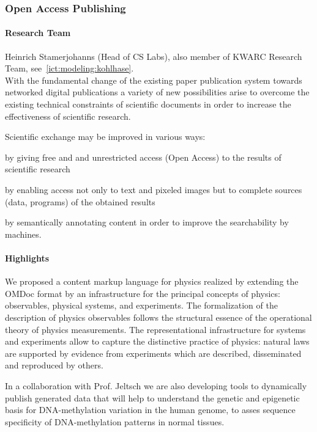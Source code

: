 \subsubsection{Open Access Publishing}
\label{ict:stamer}

\paragraph{Research Team}
Heinrich Stamerjohanns (Head of CS Labs), also member of KWARC
Research Team, see~\ref{ict:modeling:kohlhase}.\\

With the fundamental change of the existing paper publication system
towards networked digital publications a variety of new possibilities arise
to overcome the existing technical constraints of scientific documents
in order to increase the effectiveness of scientific research.

Scientific exchange may be improved in various ways:
\begin{myitemize}
\item by giving free and and unrestricted access (Open Access) to
the results of scientific research
\item by enabling access not only to text and pixeled images
but to complete sources (data, programs) of the obtained results
\item by semantically annotating content in order to improve
the searchability by machines.
\end{myitemize}

\paragraph{Highlights}

We proposed a content markup language for physics realized by
extending the OMDoc format by an infrastructure for the principal
concepts of physics: observables, physical systems, and experiments.
The formalization of the description of physics observables follows
the structural essence of the operational theory of physics
measurements. The representational infrastructure for systems and
experiments allow to capture the distinctive practice of physics:
natural laws are supported by evidence from experiments which are
described, disseminated and reproduced by others.

In a collaboration with Prof. Jeltsch we are also developing tools
to dynamically publish generated data that will help to understand the genetic
and epigenetic basis for DNA-methylation variation in the human genome,
to asses sequence specificity of DNA-methylation patterns in normal tissues.

